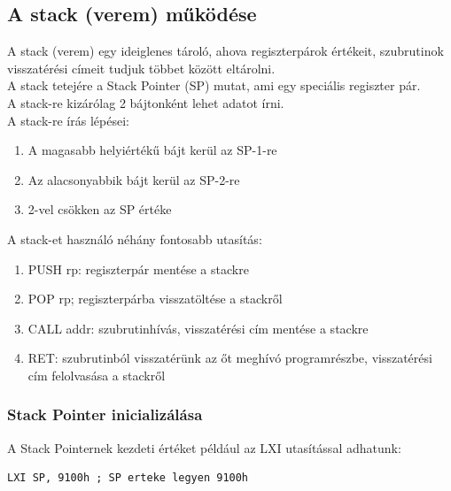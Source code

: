 \documentclass{article}
\begin{document}
\subsection{A stack (verem) működése}
A stack (verem) egy ideiglenes tároló, ahova regiszterpárok értékeit, szubrutinok visszatérési címeit tudjuk többet között eltárolni. \\
A stack tetejére a Stack Pointer (SP) mutat, ami egy speciális regiszter pár. \\
A stack-re kizárólag 2 bájtonként lehet adatot írni. \\
A stack-re írás lépései:
\begin{enumerate}
	\item A magasabb helyiértékű bájt kerül az SP-1-re
	\item Az alacsonyabbik bájt kerül az SP-2-re
	\item 2-vel csökken az SP értéke
\end{enumerate}
A stack-et használó néhány fontosabb utasítás:
\begin{enumerate}
	\item PUSH rp: regiszterpár mentése a stackre
	\item POP rp; regiszterpárba visszatöltése a stackről
	\item CALL addr: szubrutinhívás, visszatérési cím mentése a stackre
	\item RET: szubrutinból visszatérünk az őt meghívó programrészbe, visszatérési cím felolvasása a stackről
\end{enumerate}
\subsubsection{Stack Pointer inicializálása}
A Stack Pointernek kezdeti értéket például az LXI utasítással adhatunk:
\begin{lstlisting}[frame=single]
LXI SP, 9100h ; SP erteke legyen 9100h
\end{lstlisting}
\end{document}
